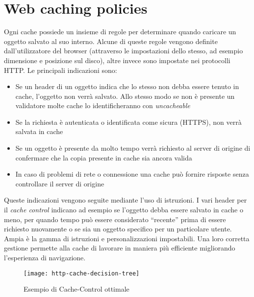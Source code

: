 \section{Web caching policies}

Ogni cache possiede un insieme di regole per determinare quando caricare un oggetto salvato al suo interno. Alcune di queste regole vengono definite dall'utilizzatore del browser (attraverso le impostazioni dello stesso, ad esempio dimensione e posizione sul disco), altre invece sono impostate nei protocolli HTTP.
Le principali indicazioni sono:

\begin{itemize}
	
	\item{Se un header di un oggetto indica che lo stesso non debba essere tenuto in cache, l'oggetto non verrà salvato. Allo stesso modo se non è presente un validatore molte cache lo identificheranno con \textit{uncacheable}}
	
	\item{Se la richiesta è autenticata o identificata come sicura (HTTPS), non verrà salvata in cache}
	
	\item{Se un oggetto è presente da molto tempo verrà richiesto al server di origine di confermare che la copia presente in cache sia ancora valida}
	
	\item{In caso di problemi di rete o connessione una cache può fornire risposte senza controllare il server di origine} 
	
\end{itemize}

Queste indicazioni vengono seguite mediante l'uso di istruzioni. I vari header per il \textit{cache control} indicano ad esempio se l'oggetto debba essere salvato in cache o meno, per quando tempo può essere considerato ``recente'' prima di essere richiesto nuovamente o se sia un oggetto specifico per un particolare utente. Ampia è la gamma di istruzioni e personalizzazioni impostabili. Una loro corretta gestione permette alla cache di lavorare in maniera più efficiente migliorando l'esperienza di navigazione.

\begin{figure}[htpb]
	\begin{center}
		\texttt{[image: http-cache-decision-tree]}
	\end{center}
	\caption[Esempio di Cache-Control ottimale]{Esempio di Cache-Control ottimale\footnotemark}
\end{figure}

